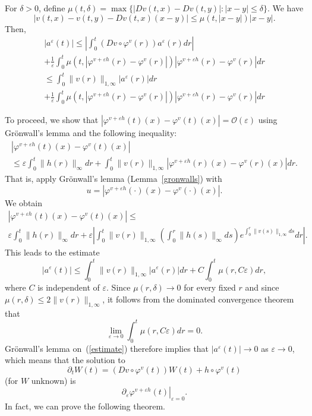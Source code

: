 \documentclass[a5paper,11pt,twoside]{article}
\theoremstyle{plain}
\theoremstyle{definition}
\begin{document}
For $\delta>0$, define $\mu(t,\delta)=\max\{|Dv(t,x)-Dv(t,y)|: |x-y|\leq \delta\}.$ We have
\[
|v(t,x)-v(t,y)-Dv(t,x)(x-y)|\leq \mu(t,|x-y|)|x-y|.
\]
Then,
%
\begin{multline*}
|a^\varepsilon(t)|\leq \left|\int_0^t\left(Dv\circ \varphi^v(r)\right)a^\varepsilon(r)dr\right|\\+\frac{1}{\varepsilon}\int_0^t \mu(t,|\varphi^{v+\varepsilon h}(r)-\varphi^v(r)|)\left|\varphi^{v+\varepsilon h}(r)-\varphi^v(r)\right|dr 
\end{multline*}
\begin{multline*}
\leq \int_0^t\|v(r)\|_{1,\infty}|a^\varepsilon(r)|dr\\+\frac{1}{\varepsilon}\int_0^t \mu(t,|\varphi^{v+\varepsilon h}(r)-\varphi^v(r)|)\left|\varphi^{v+\varepsilon h}(r)-\varphi^v(r)\right|dr 
\end{multline*}

To proceed, we show that $|\varphi^{v+\varepsilon h}(t)(x)-\varphi^v(t)(x)|=\mathcal{O}(\varepsilon)$ using Grön\-wall's lemma and the following inequality:
%
\begin{multline*}
|\varphi^{v+\varepsilon h}(t)(x)-\varphi^v(t)(x)|\\ \leq  \varepsilon\int_0^t\|h(r)\|_\infty dr+ \int_0^t\|v(r)\|_{1,\infty}\left|\varphi^{v+\varepsilon h}(r)(x)-\varphi^v(r)(x)\right|dr .
\end{multline*}
%
That is, apply Grönwall's lemma (Lemma~\ref{gronwalls}) with $$u=|\varphi^{v+\varepsilon h}(\cdot)(x)-\varphi^v(\cdot)(x)|.$$
We obtain
%
\begin{multline*}
|\varphi^{v+\varepsilon h}(t)(x)-\varphi^v(t)(x)|\leq \\  \varepsilon\int_0^t\|h(r)\|_\infty dr 
+ \varepsilon\left|\int_0^t\|v(r)\|_{1,\infty}\left(\int_0^r\|h(s)\|_\infty ds\right)e^{\int_0^r \|v(s)\|_{1,\infty}ds} dr\right|.
\end{multline*}
%
This leads to the estimate
%
\begin{equation}
\label{estimate}
|a^\varepsilon(t)|\leq \int_0^t\|v(r)\|_{1,\infty}|a^\varepsilon(r)|dr + C\int_0^t\mu(r,C\varepsilon)dr,
\end{equation}
%
where $C$ is independent of $\varepsilon$. Since $\mu(r,\delta)\to 0$ for every fixed $r$ and since $\mu(r,\delta)\leq 2\|v(r)\|_{1,\infty}$, it follows from the dominated convergence theorem that
\[
\lim_{\varepsilon\to 0}\int_0^t \mu(r,C\varepsilon)dr=0.
\]
Grönwall's lemma on~(\ref{estimate}) therefore implies that $|a^\varepsilon(t)|\to 0$ as $\varepsilon\to 0$, which means that the solution to
\[
\partial_t W(t)=\left(Dv\circ \varphi^v(t)\right)W(t)+h\circ \varphi^v(t)
\]
(for $W$ unknown) is
\[
\left.\partial_\varepsilon\varphi^{v+\varepsilon h}(t)\right|_{\varepsilon=0}.
\]
In fact, we can prove the following theorem.
\end{document}
